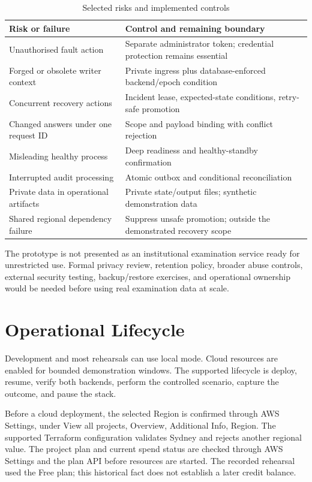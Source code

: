 \begin{table}[H]\centering\small
\caption{Selected risks and implemented controls}\label{tab:risks}
\begin{tabularx}{\textwidth}{@{}L{41mm}Y@{}}\toprule
\textbf{Risk or failure} & \textbf{Control and remaining boundary}\\\midrule
Unauthorised fault action & Separate administrator token; credential protection remains essential\\
Forged or obsolete writer context & Private ingress plus database-enforced backend/epoch condition\\
Concurrent recovery actions & Incident lease, expected-state conditions, retry-safe promotion\\
Changed answers under one request ID & Scope and payload binding with conflict rejection\\
Misleading healthy process & Deep readiness and healthy-standby confirmation\\
Interrupted audit processing & Atomic outbox and conditional reconciliation\\
Private data in operational artifacts & Private state/output files; synthetic demonstration data\\
Shared regional dependency failure & Suppress unsafe promotion; outside the demonstrated recovery scope\\\bottomrule
\end{tabularx}\end{table}

The prototype is not presented as an institutional examination service ready for unrestricted use. Formal privacy review, retention policy, broader abuse controls, external security testing, backup/restore exercises, and operational ownership would be needed before using real examination data at scale.
\section{Operational Lifecycle}
Development and most rehearsals can use local mode. Cloud resources are enabled for bounded demonstration windows. The supported lifecycle is deploy, resume, verify both backends, perform the controlled scenario, capture the outcome, and pause the stack.

Before a cloud deployment, the selected Region is confirmed through AWS Settings, under View all projects, Overview, Additional Info, Region. The supported Terraform configuration validates Sydney and rejects another regional value. The project plan and current spend status are checked through AWS Settings and the plan API before resources are started. The recorded rehearsal used the Free plan; this historical fact does not establish a later credit balance.

